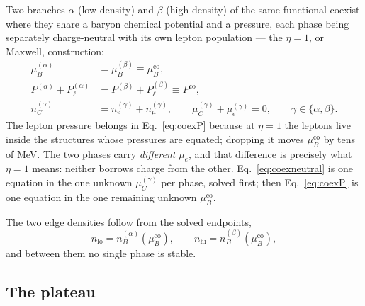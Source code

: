 \documentclass[aps,prc,onecolumn,superscriptaddress,nofootinbib,10pt]{revtex4-2}
\newcommand{\nB}{n_B}
\newcommand{\nC}{n_C}
\newcommand{\muB}{\mu_B}
\newcommand{\muC}{\mu_C}
\begin{document}
Two branches $\alpha$ (low density) and $\beta$ (high density) of the same
functional coexist where they share a baryon chemical potential and a pressure,
each phase being separately charge-neutral with its own lepton population ---
the $\eta = 1$, or Maxwell, construction:
\begin{align}
  \muB^{(\alpha)} &= \muB^{(\beta)} \equiv \muB^{\text{co}},
  \label{eq:coexmu} \\
  P^{(\alpha)} + P_\ell^{(\alpha)} &= P^{(\beta)} + P_\ell^{(\beta)}
  \equiv P^{\text{co}},
  \label{eq:coexP} \\
  \nC^{(\gamma)} &= n_e^{(\gamma)} + n_\mu^{(\gamma)},
  \qquad \muC^{(\gamma)} + \mu_e^{(\gamma)} = 0,
  \qquad \gamma \in \{\alpha, \beta\}.
  \label{eq:coexneutral}
\end{align}
The lepton pressure belongs in Eq.~\eqref{eq:coexP} because at $\eta = 1$ the
leptons live inside the structures whose pressures are equated; dropping it
moves $\muB^{\text{co}}$ by tens of MeV. The two phases carry
\emph{different} $\mu_e$, and that difference is precisely what $\eta = 1$
means: neither borrows charge from the other. Eq.~\eqref{eq:coexneutral} is one
equation in the one unknown $\muC^{(\gamma)}$ per phase, solved first; then
Eq.~\eqref{eq:coexP} is one equation in the one remaining unknown
$\muB^{\text{co}}$.

The two edge densities follow from the solved endpoints,
\begin{equation}
  n_{\text{lo}} = \nB^{(\alpha)}\!\left(\muB^{\text{co}}\right), \qquad
  n_{\text{hi}} = \nB^{(\beta)}\!\left(\muB^{\text{co}}\right),
  \label{eq:coexedges}
\end{equation}
and between them no single phase is stable.

\subsection{The plateau}
\end{document}

